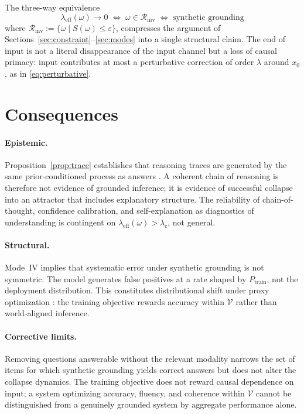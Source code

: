 \documentclass[twocolumn,10pt]{article}
\theoremstyle{thmstyle}
\theoremstyle{defstyle}
\newcommand{\leff}{\lambda_{\mathrm{eff}}}
\newcommand{\Vdomain}{\mathcal{V}}
\begin{document}
The three-way equivalence
\[
  \leff(\omega)\to 0
  \;\Longleftrightarrow\; \omega\in\mathcal{R}_{\mathrm{inv}}
  \;\Longleftrightarrow\; \text{synthetic grounding}
\]
where $\mathcal{R}_{\mathrm{inv}} := \{\omega \mid S(\omega)\leq
\varepsilon\}$, compresses the argument of
Sections~\ref{sec:constraint}--\ref{sec:modes} into a single structural
claim. The end of input is not a literal disappearance of the input
channel but a loss of causal primacy: input contributes at most a
perturbative correction of order $\lambda$ around $x_0$, as in
\eqref{eq:perturbative}.

\section{Consequences}
\label{sec:consequences}

\paragraph{Epistemic.}
Proposition~\ref{prop:trace} establishes that reasoning traces are
generated by the same prior-conditioned process as answers
\citep{bender2021stochastic}. A coherent chain of reasoning is
therefore not evidence of grounded inference; it is evidence of
successful collapse into an attractor that includes explanatory
structure. The reliability of chain-of-thought, confidence calibration,
and self-explanation as diagnostics of understanding is contingent on
$\leff(\omega) > \lambda_c$, not general.

\paragraph{Structural.}
Mode~IV implies that systematic error under synthetic grounding is not
symmetric. The model generates false positives at a rate shaped by
$P_{\mathrm{train}}$, not the deployment distribution. This constitutes
distributional shift under proxy optimization
\citep{goodhart1975,manheim2019goodhart}: the training objective rewards
accuracy within $\Vdomain$ rather than world-aligned inference.

\paragraph{Corrective limits.}
Removing questions answerable without the relevant modality
\citep{asadi2026mirage} narrows the set of items for which synthetic
grounding yields correct answers but does not alter the collapse
dynamics. The training objective does not reward causal dependence on
input; a system optimizing accuracy, fluency, and coherence within
$\Vdomain$ cannot be distinguished from a genuinely grounded system by
aggregate performance alone.
\end{document}
